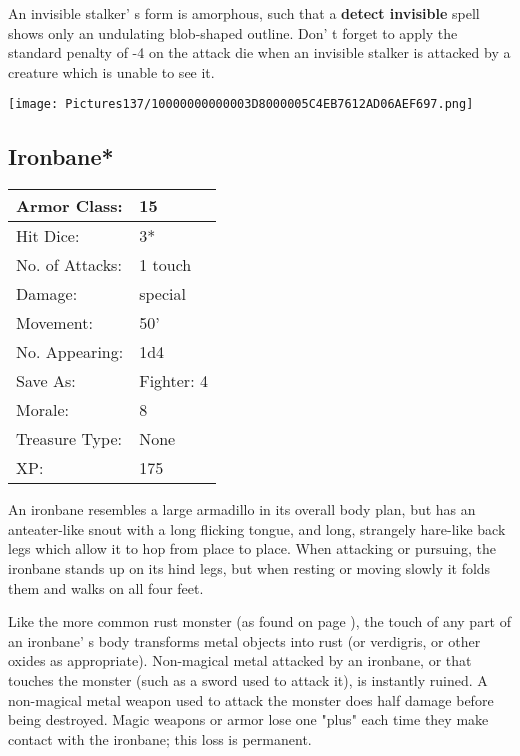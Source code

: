 \documentclass[a4paper,twoside,openany,10pt]{book}
\begin{document}
\begin{multicols}{2}
An invisible stalker' s form is amorphous, such that a \textbf{detect invisible} spell shows only an undulating blob-shaped outline. Don' t forget to apply the standard penalty of -4 on the attack die when an invisible stalker is attacked by a creature which is unable to see it.


\begin{center}
	\texttt{[image: Pictures137/10000000000003D8000005C4EB7612AD06AEF697.png]}
\end{center}

\subsection*{Ironbane*}\label{ironbane}

\begin{tabularx}{0.50\textwidth}{@{}lX@{}}
Armor Class: & 15 \\\hline
Hit Dice: & 3* \\\hline
No. of Attacks: & 1 touch \\\hline
Damage: & special \\\hline
Movement: & 50' \\\hline
No. Appearing: & 1d4 \\\hline
Save As: & Fighter: 4 \\\hline
Morale: & 8 \\\hline
Treasure Type: & None \\\hline
XP: & 175 \\\hline
\end{tabularx}\medskip

An ironbane resembles a large armadillo in its overall body plan, but has an anteater-like snout with a long flicking tongue, and long, strangely hare-like back legs which allow it to hop from place to place. When attacking or pursuing, the ironbane stands up on its hind legs, but when resting or moving slowly it folds them and walks on all four feet.

Like the more common rust monster (as found on page \hyperlink{rust-monster}{\pageref{rust-monster}}), the touch of any part of an ironbane' s body transforms metal objects into rust (or verdigris, or other oxides as appropriate). Non-magical metal attacked by an ironbane, or that touches the monster (such as a sword used to attack it), is instantly ruined. A non-magical metal weapon used to attack the monster does half damage before being destroyed. Magic weapons or armor lose one "plus" each time they make contact with the ironbane; this loss is permanent.


\end{multicols}
\end{document}

